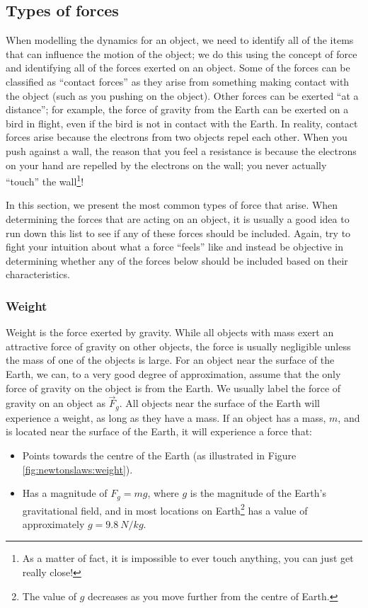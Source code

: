 \subsection{Types of forces}
When modelling the dynamics for an object, we need to identify all of the items that can influence the motion of the object; we do this using the concept of force and identifying all of the forces exerted on an object. Some of the forces can be classified as ``contact forces'' as they arise from something making contact with the object (such as you pushing on the object). Other forces can be exerted ``at a distance''; for example, the force of gravity from the Earth can be exerted on a bird in flight, even if the bird is not in contact with the Earth. In reality, contact forces arise because the electrons from two objects repel each other. When you push against a wall, the reason that you feel a resistance is because the electrons on your hand are repelled by the electrons on the wall; you never actually ``touch'' the wall\footnote{As a matter of fact, it is impossible to ever touch anything, you can just get really close!}!

In this section, we present the most common types of force that arise. When determining the forces that are acting on an object, it is usually a good idea to run down this list to see if any of these forces should be included. Again, try to fight your intuition about what a force ``feels'' like and instead be objective in determining whether any of the forces below should be included based on their characteristics.

\subsubsection{Weight}
Weight is the force exerted by gravity. While all objects with mass exert an attractive force of gravity on other objects, the force is usually negligible unless the mass of one of the objects is large. For an object near the surface of the Earth, we can, to a very good degree of approximation, assume that the only force of gravity on the object is from the Earth. We usually label the force of gravity on an object as $\vec F_g$. All objects near the surface of the Earth will experience a weight, as long as they have a mass. If an object has a mass, $m$, and is located near the surface of the Earth, it will experience a force that:
\begin{itemize}
\item Points towards the centre of the Earth (as illustrated in Figure \ref{fig:newtonslaws:weight}).
\item Has a magnitude of $F_g=mg$, where $g$ is the magnitude of the Earth's gravitational field, and in most locations on Earth\footnote{The value of $g$ decreases as you move further from the centre of Earth.} has a value of approximately $g=\SI{9.8}{N/kg}$.
\end{itemize}

